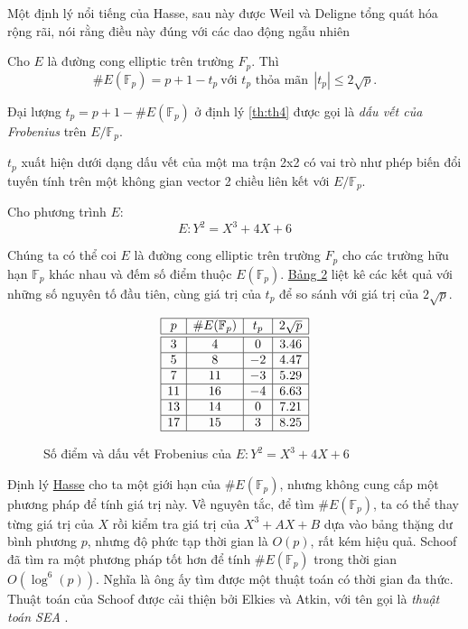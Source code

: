 Một định lý nổi tiếng của Hasse, sau này được Weil và Deligne tổng quát hóa rộng rãi,
nói rằng điều này đúng với các dao động ngẫu nhiên

\begin{theorem}[Hasse]
	\label{th:th4}
	Cho $E$ là đường cong elliptic trên trường $F_{p}$. Thì
	$$ \#E(\mathbb{F}_{p}) = p + 1  -t_p \  \text{với $t_p$ thỏa mãn} \ \ |t_p| \leq 2\sqrt{p}.$$
\end{theorem}

\begin{definition}
	Đại lượng $t_p = p+1 - \#E(\mathbb{F}_p)$ ở định lý \ref{th:th4} được gọi là \textit{dấu vết của Frobenius} trên $E/\mathbb{F}_p$.
\end{definition}
$t_p$ xuất hiện dưới dạng dấu vết của một ma trận 2x2 có vai trò như phép biến đổi tuyến tính trên một không gian vector 2 chiều liên kết với  $E/\mathbb{F}_p$.

\begin{example}
	\label{ex:ex6}
	Cho phương trình $E$:
	$$E: Y^2 = X^3 + 4X + 6$$
\end{example}

Chúng ta có thể coi $E$ là đường cong elliptic trên trường $F_{p}$ cho các trường hữu hạn $\mathbb{F}_{p}$ khác nhau và đếm số điểm thuộc $E(\mathbb{F}_p).$
\hyperref[fg:tb2]{Bảng 2} liệt kê các kết quả với những số nguyên tố đầu tiên, cùng giá trị của $t_p$ để so sánh với giá trị của $2\sqrt{p}$.

\begin{figure}[H]
	\label{fg:tb2}
	\caption{Số điểm và dấu vết Frobenius của $E:Y^2 = X^3 + 4X + 6$}
	$$
		\begin{array}{|c|c|c|c|}
			\hline
			p  & \#E(\mathbb{F}_p) & t_p & 2\sqrt{p} \\
			\hline
			\hline
			3  & 4                 & 0   & 3.46      \\
			\hline
			5  & 8                 & -2  & 4.47      \\
			\hline
			7  & 11                & -3  & 5.29      \\
			\hline
			11 & 16                & -4  & 6.63      \\
			\hline
			13 & 14                & 0   & 7.21      \\
			\hline
			17 & 15                & 3   & 8.25      \\
			\hline
		\end{array}
	$$
\end{figure}

\begin{remark}
	Định lý \hyperref[th:th4]{Hasse} cho ta một giới hạn của $\#E(\mathbb{F}_p)$, nhưng không cung cấp một phương pháp để tính giá trị này.
	Về nguyên tắc, để tìm $\#E(\mathbb{F}_p)$, ta có thể thay từng giá trị của $X$ rồi kiểm tra giá trị của $X^3 + AX + B$ dựa vào bảng thặng dư bình phương $p$, nhưng độ phức tạp thời gian là $O(p)$, rất kém hiệu quả.
	Schoof \cite{schoof1985elliptic} đã tìm ra một phương pháp tốt hơn để tính $\#E(\mathbb{F}_p)$ trong thời gian $O(\log^6(p))$.
	Nghĩa là ông ấy tìm được một thuật toán có thời gian đa thức. Thuật toán của Schoof được cải thiện bởi Elkies và Atkin, với tên gọi là \textit{thuật toán SEA} \cite{schoof1995counting}.
\end{remark}